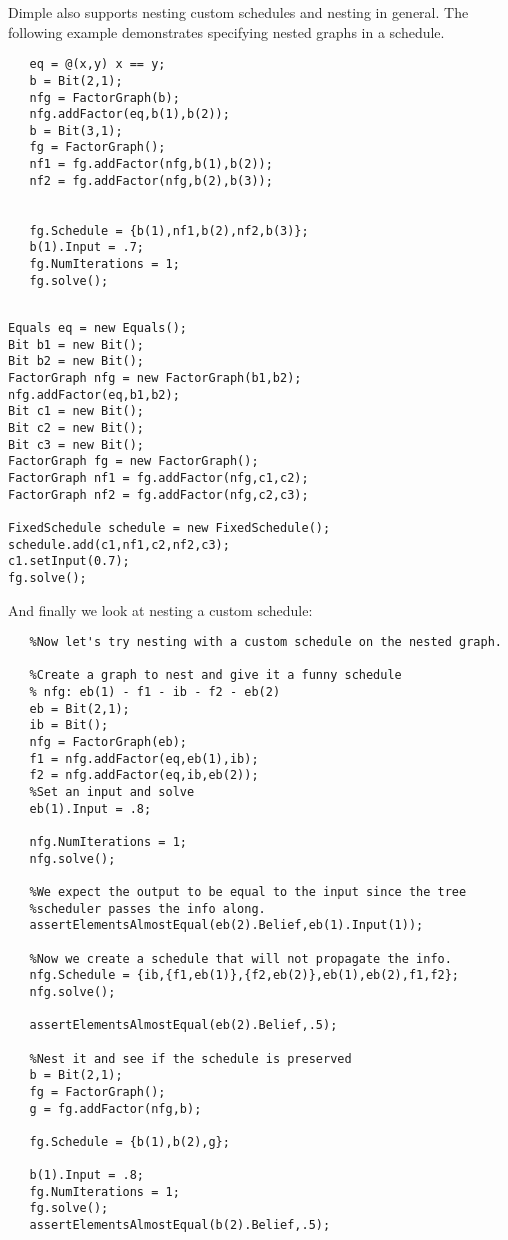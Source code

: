 Dimple also supports nesting custom schedules and nesting in general. The following example demonstrates specifying nested graphs in a schedule.

\ifmatlab

\begin{lstlisting}
   eq = @(x,y) x == y;
   b = Bit(2,1);
   nfg = FactorGraph(b);
   nfg.addFactor(eq,b(1),b(2));
   b = Bit(3,1);
   fg = FactorGraph();
   nf1 = fg.addFactor(nfg,b(1),b(2));
   nf2 = fg.addFactor(nfg,b(2),b(3));
   
   
   fg.Schedule = {b(1),nf1,b(2),nf2,b(3)};
   b(1).Input = .7;
   fg.NumIterations = 1;
   fg.solve();
\end{lstlisting}

\fi

\ifjava
\begin{lstlisting}

Equals eq = new Equals();
Bit b1 = new Bit();
Bit b2 = new Bit();
FactorGraph nfg = new FactorGraph(b1,b2);
nfg.addFactor(eq,b1,b2);
Bit c1 = new Bit();
Bit c2 = new Bit();
Bit c3 = new Bit();
FactorGraph fg = new FactorGraph();
FactorGraph nf1 = fg.addFactor(nfg,c1,c2);
FactorGraph nf2 = fg.addFactor(nfg,c2,c3);

FixedSchedule schedule = new FixedSchedule();
schedule.add(c1,nf1,c2,nf2,c3);
c1.setInput(0.7);
fg.solve();
\end{lstlisting}

\fi


And finally we look at nesting a custom schedule:

\ifmatlab

\begin{lstlisting}
   %Now let's try nesting with a custom schedule on the nested graph.
   
   %Create a graph to nest and give it a funny schedule    
   % nfg: eb(1) - f1 - ib - f2 - eb(2)
   eb = Bit(2,1);
   ib = Bit();
   nfg = FactorGraph(eb);
   f1 = nfg.addFactor(eq,eb(1),ib);
   f2 = nfg.addFactor(eq,ib,eb(2));
   %Set an input and solve
   eb(1).Input = .8;
   
   nfg.NumIterations = 1;
   nfg.solve();
   
   %We expect the output to be equal to the input since the tree
   %scheduler passes the info along.
   assertElementsAlmostEqual(eb(2).Belief,eb(1).Input(1));
   
   %Now we create a schedule that will not propagate the info.
   nfg.Schedule = {ib,{f1,eb(1)},{f2,eb(2)},eb(1),eb(2),f1,f2};
   nfg.solve();
   
   assertElementsAlmostEqual(eb(2).Belief,.5);

   %Nest it and see if the schedule is preserved
   b = Bit(2,1);
   fg = FactorGraph();
   g = fg.addFactor(nfg,b);
   
   fg.Schedule = {b(1),b(2),g};
   
   b(1).Input = .8;
   fg.NumIterations = 1;
   fg.solve();
   assertElementsAlmostEqual(b(2).Belief,.5);
\end{lstlisting}

